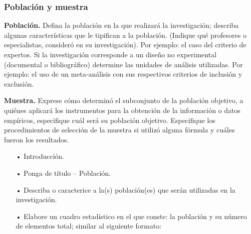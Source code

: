 \documentclass[12pt, a4paper, nofontenc, numbers=endperiod]{apa7}
\begin{document}
{\subsubsection*{\normalsize Población y muestra}
		
\setlength{\parindent}{1.27cm}\textbf{{\normalsize Población.}} Defina la población en la que realizará la investigación; describa algunas características que le tipifican a la población. (Indique qué profesores o especialistas, consideró en su investigación). Por ejemplo: el caso del criterio de expertos. Si la investigación corresponde a un diseño no experimental (documental o bibliográfico) determine las unidades de análisis utilizadas. Por ejemplo: el uso de un meta-análisis con sus respectivos criterios de inclusión y exclusión. 

\setlength{\parindent}{1.27cm}\textbf{{\normalsize Muestra.}}  Exprese cómo determinó el subconjunto de la población objetivo, a quiénes aplicará los instrumentos para la obtención de la información o datos empíricos, especifique cuál será su población objetivo. Especifique los procedimientos de selección de la muestra si utilizó alguna fórmula y cuáles fueron los resultados. 
		{\doublespacing
			\begin{itemize}[leftmargin=1.70cm]
				\item[•]  Introducción.
				\item[•]  Ponga de título – Población.
				\item[•]  Describa o caracterice a la(s) población(es) que serán utilizadas en la investigación.
				\item[•]  Elabore un cuadro estadístico en el que conste: la población y su número de elementos total; similar al siguiente formato:
				
			\end{itemize}
		}

}
\end{document}
